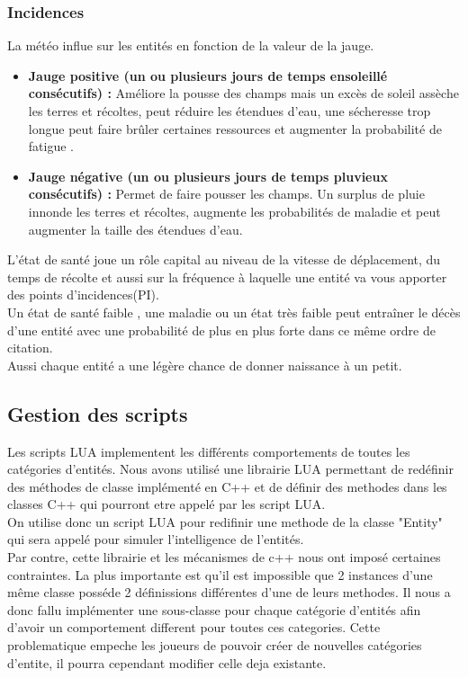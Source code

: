 \documentclass[a4paper]{memoir}
\begin{document}
				\subsubsection{Incidences}
					\label{IncidenceE}
					La météo influe sur les entités en fonction de la valeur de la jauge.
					\begin{itemize}[label=$\bullet$]
						\item \textbf{Jauge positive (un ou plusieurs jours de temps ensoleillé consécutifs) :} Améliore la pousse des champs mais un excès de soleil assèche les terres et récoltes, peut réduire les étendues d'eau, une sécheresse trop longue peut faire brûler certaines ressources et augmenter la probabilité de fatigue .
						\item \textbf{Jauge négative (un ou plusieurs jours de temps pluvieux consécutifs) :} Permet de faire pousser les champs. Un surplus de pluie innonde les terres et récoltes, augmente les probabilités de maladie et peut augmenter la taille des étendues d'eau.
					\end{itemize}
					L'état de santé joue un rôle capital au niveau de la vitesse de déplacement, du temps de récolte et aussi sur la fréquence à laquelle une entité va vous apporter des points d'incidences(PI).\\
					Un état de santé faible , une maladie ou un état très faible peut entraîner le décès    d'une entité avec une probabilité de plus en plus forte dans ce même ordre de citation.\\
					Aussi chaque entité a une légère chance de donner naissance à un petit.
			
			\subsection{Gestion des scripts}
				Les scripts LUA implementent les différents comportements de toutes les catégories d'entités. Nous avons utilisé une librairie LUA permettant de redéfinir des méthodes de classe implémenté en C++ et de définir des methodes dans les classes C++ qui pourront etre appelé par les script LUA.\\
				On utilise donc un script LUA pour redifinir une methode de la classe "Entity" qui sera appelé pour simuler l'intelligence de l'entités.\\
				Par contre, cette librairie et les mécanismes de c++ nous ont imposé certaines contraintes. La plus importante est qu'il est impossible que 2 instances d'une même classe posséde 2 définissions différentes d'une de leurs methodes. Il nous a donc fallu implémenter une sous-classe pour chaque catégorie d'entités afin d'avoir un comportement different pour toutes ces categories. Cette problematique empeche les joueurs de pouvoir créer de nouvelles catégories d'entite, il pourra cependant modifier celle deja existante.
				
\end{document}
